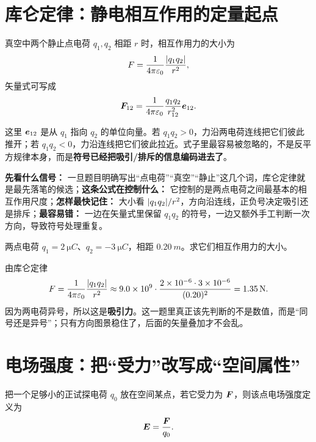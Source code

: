 \documentclass[lang=cn,11pt]{elegantbook}
\begin{document}
\section{库仑定律：静电相互作用的定量起点}

\begin{theorem}[库仑定律]
真空中两个静止点电荷 \(q_1,q_2\) 相距 \(r\) 时，相互作用力的大小为
\[
F=\frac{1}{4\pi\varepsilon_0}\frac{\abs{q_1q_2}}{r^2},
\]
矢量式可写成
\[
\vb*{F}_{12}
=\frac{1}{4\pi\varepsilon_0}\frac{q_1q_2}{r_{12}^2}\vb*{e}_{12}.
\]
\end{theorem}

这里 \(\vb*{e}_{12}\) 是从 \(q_1\) 指向 \(q_2\) 的单位向量。若 \(q_1q_2>0\)，力沿两电荷连线把它们彼此推开；若 \(q_1q_2<0\)，力沿连线把它们彼此拉近。式子里最容易被忽略的，不是反平方规律本身，而是\textbf{符号已经把吸引/排斥的信息编码进去了}。

\begin{note}
\textbf{先看什么信号：} 一旦题目明确写出“点电荷”“真空”“静止”这几个词，库仑定律就是最先落笔的候选；\textbf{这条公式在控制什么：} 它控制的是两点电荷之间最基本的相互作用尺度；\textbf{怎样最快记住：} 大小看 \(\abs{q_1q_2}/r^2\)，方向沿连线，正负号决定吸引还是排斥；\textbf{最容易错：} 一边在矢量式里保留 \(q_1q_2\) 的符号，一边又额外手工判断一次方向，导致符号处理重复。
\end{note}

\begin{example}
两点电荷 \(q_1=\SI{2}{\micro C}\)、\(q_2=-\SI{3}{\micro C}\)，相距 \(\SI{0.20}{m}\)。求它们相互作用力的大小。
\end{example}

\begin{solution}
由库仑定律
\[
F=\frac{1}{4\pi\varepsilon_0}\frac{\abs{q_1q_2}}{r^2}
\approx 9.0\times 10^9\cdot \frac{2\times 10^{-6}\cdot 3\times 10^{-6}}{(0.20)^2}
=\SI{1.35}{N}.
\]
因为两电荷异号，所以这是\textbf{吸引力}。这一题里真正该先判断的不是数值，而是“同号还是异号”；只有方向图景稳住了，后面的矢量叠加才不会乱。
\end{solution}

\section{电场强度：把“受力”改写成“空间属性”}

\begin{definition}[电场强度]
把一个足够小的正试探电荷 \(q_0\) 放在空间某点，若它受力为 \(\vb*{F}\)，则该点电场强度定义为
\[
\vb*{E}=\frac{\vb*{F}}{q_0}.
\]
\end{definition}
\end{document}
